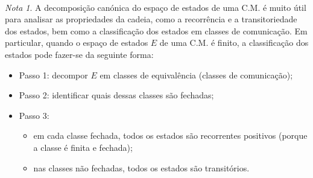 \documentclass[
  11pt,
  a4paper,
]{book}
\theoremstyle{definition}
\theoremstyle{definition}
\theoremstyle{definition}
\theoremstyle{definition}
\theoremstyle{remark}
\newtheorem*{remark}{Nota }
\begin{document}
\(\,\)

\begin{remark}

A decomposição canónica do espaço de estados de uma C.M. é muito útil para analisar as propriedades da cadeia, como a recorrência e a transitoriedade dos estados, bem como a classificação dos estados em classes de comunicação. Em particular, quando o espaço de estados \(E\) de uma C.M. é finito, a classificação dos estados pode fazer-se da seguinte forma:

\begin{itemize}
\item
  Passo 1: decompor \(E\) em classes de equivalência (classes de comunicação);
\item
  Passo 2: identificar quais dessas classes são fechadas;
\item
  Passo 3:

  \begin{itemize}
  \item
    em cada classe fechada, todos os estados são recorrentes positivos (porque a classe é finita e fechada);
  \item
    nas classes não fechadas, todos os estados são transitórios.
  \end{itemize}
\end{itemize}

\end{remark}

\(\,\)
\end{document}
